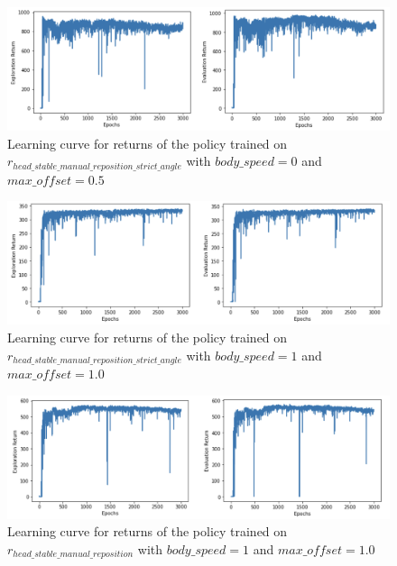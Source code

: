   \begin{figure}[H]
      \centering
      \includegraphics[width=1\textwidth]{figures/learning_curves/manual_bs_0.png}
      \caption{Learning curve for returns of the policy trained on $r_{head\_stable\_manual\_reposition\_strict\_angle}$ with $body\_speed = 0$ and $max\_offset = 0.5$}
      \label{fig:learning_rate_manual_bs_0}
  \end{figure}

  \begin{figure}[H]
      \centering
      \includegraphics[width=1\textwidth]{figures/learning_curves/manual_strict_bs_1.png}
      \caption{Learning curve for returns of the policy trained on $r_{head\_stable\_manual\_reposition\_strict\_angle}$ with $body\_speed = 1$ and $max\_offset = 1.0$}
      \label{fig:learning_rate_manual_strict_bs_1}
  \end{figure}

  \begin{figure}[H]
      \centering
      \includegraphics[width=1\textwidth]{figures/learning_curves/manual_not_strict_bs_1.png}
      \caption{Learning curve for returns of the policy trained on $r_{head\_stable\_manual\_reposition}$ with $body\_speed = 1$ and $max\_offset = 1.0$}
      \label{fig:learning_rate_manual_not_strict_bs_1}
  \end{figure}

